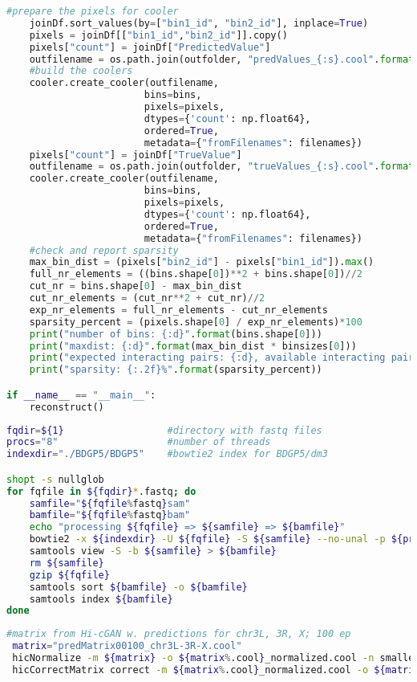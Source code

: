 \begin{lstlisting}[language=python, caption=Custom script to convert HiC-Reg's text output to cooler format, label=list:methods:hicreg2cool]
	#prepare the pixels for cooler
	joinDf.sort_values(by=["bin1_id", "bin2_id"], inplace=True)
	pixels = joinDf[["bin1_id","bin2_id"]].copy()
	pixels["count"] = joinDf["PredictedValue"]
	outfilename = os.path.join(outfolder, "predValues_{:s}.cool".format(str(chrom)))
	#build the coolers
	cooler.create_cooler(outfilename, 
						bins=bins, 
						pixels=pixels, 
						dtypes={'count': np.float64}, 
						ordered=True, 
						metadata={"fromFilenames": filenames})
	pixels["count"] = joinDf["TrueValue"]
	outfilename = os.path.join(outfolder, "trueValues_{:s}.cool".format(str(chrom)))
	cooler.create_cooler(outfilename, 
						bins=bins, 
						pixels=pixels, 
						dtypes={'count': np.float64}, 
						ordered=True, 
						metadata={"fromFilenames": filenames})
	#check and report sparsity
	max_bin_dist = (pixels["bin2_id"] - pixels["bin1_id"]).max()
	full_nr_elements = ((bins.shape[0])**2 + bins.shape[0])//2
	cut_nr = bins.shape[0] - max_bin_dist
	cut_nr_elements = (cut_nr**2 + cut_nr)//2
	exp_nr_elements = full_nr_elements - cut_nr_elements
	sparsity_percent = (pixels.shape[0] / exp_nr_elements)*100
	print("number of bins: {:d}".format(bins.shape[0]))
	print("maxdist: {:d}".format(max_bin_dist * binsizes[0]))
	print("expected interacting pairs: {:d}, available interacting pairs: {:d}".format(exp_nr_elements, pixels.shape[0]))
	print("sparsity: {:.2f}%".format(sparsity_percent))

if __name__ == "__main__":
	reconstruct()
\end{lstlisting}

\begin{lstlisting}[language=bash, caption=Mapping ChIP-seq reads to D. melanogaster ref. genome, label=list:methods:map_drosophila]
fqdir=${1}                  #directory with fastq files
procs="8"                   #number of threads
indexdir="./BDGP5/BDGP5"    #bowtie2 index for BDGP5/dm3

shopt -s nullglob
for fqfile in ${fqdir}*.fastq; do
	samfile="${fqfile%fastq}sam"
	bamfile="${fqfile%fastq}bam"
	echo "processing ${fqfile} => ${samfile} => ${bamfile}"
	bowtie2 -x ${indexdir} -U ${fqfile} -S ${samfile} --no-unal -p ${procs}
	samtools view -S -b ${samfile} > ${bamfile}
	rm ${samfile}
	gzip ${fqfile}
	samtools sort ${bamfile} -o ${bamfile}
	samtools index ${bamfile}
done
\end{lstlisting}

\begin{lstlisting}[language=bash, caption=ICE-normalization of predicted D. Melanogaster Hi-C matrix from Hi-cGAN, label=list:appendix:ice-norm]
 #matrix from Hi-cGAN w. predictions for chr3L, 3R, X; 100 ep
 matrix="predMatrix00100_chr3L-3R-X.cool"
 hicNormalize -m ${matrix} -o ${matrix%.cool}_normalized.cool -n smallest
 hicCorrectMatrix correct -m ${matrix%.cool}_normalized.cool -o ${matrix%.cool}_ICE.cool --correctionMethod ICE --filterThreshold -3.0 3.0 
\end{lstlisting}


